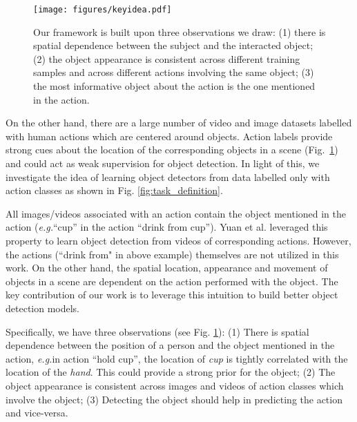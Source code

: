 \documentclass[10pt,twocolumn,letterpaper]{article}
\def\eg{\emph{e.g.}}
\begin{document}
\begin{figure}
\vspace{-0.5\baselineskip}
\texttt{[image: figures/keyidea.pdf]}
\caption{Our framework is built upon three observations we draw: (1) there is spatial dependence between the subject and the interacted object; (2) the object appearance is consistent across different training samples and across different actions involving the same object; (3) the most informative object about the action is the one mentioned in the action.}
\label{fig:poor_figure}
\vspace{-1.2\baselineskip}
\end{figure}

On the other hand, there are a large number of video and image datasets \cite{sigurdsson2016hollywood,gu2017ava,carreira2017quo,chao2018learning,Damen2018EPICKITCHENS} labelled with human actions which are centered around objects. Action labels provide strong cues about the location of the corresponding objects in a scene (Fig.~\ref{fig:poor_figure}) and could act as weak supervision for object detection. In light of this, we investigate the idea of learning object detectors from data labelled only with action classes as shown in Fig. \ref{fig:task_definition}.




All images/videos associated with an action contain the object mentioned in the action (\eg ``cup'' in the action ``drink from cup''). Yuan et al. \cite{yuan2017temporal} leveraged this property to learn object detection from videos of corresponding actions. However, the actions (``drink from" in above example) themselves are not utilized in this work. On the other hand, the spatial location, appearance and movement of objects in a scene are dependent on the action performed with the object. The key contribution of our work is to leverage this intuition to build better object detection models.

Specifically, we have three observations (see Fig. \ref{fig:poor_figure}): (1) There is spatial dependence between the position of a person and the object mentioned in the action, \eg in action ``hold cup'', the location of \textit{cup} is tightly correlated with the location of the \textit{hand}. This could provide a strong prior for the object; (2) The object appearance is consistent across images and videos of action classes which involve the object; (3) Detecting the object should help in predicting the action and vice-versa.
\end{document}
